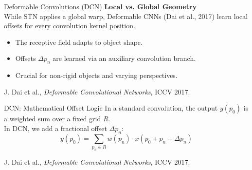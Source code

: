 \documentclass[aspectratio=169,10pt]{beamer}
\begin{document}
\begin{frame}{Deformable Convolutions (DCN)}
    \textbf{Local vs. Global Geometry}\\
    While STN applies a global warp, Deformable CNNs (Dai et al., 2017) learn local offsets for every convolution kernel position. 
    
    \vspace{0.5em}
    \begin{itemize}
        \item The receptive field adapts to object shape. 
        \item Offsets $\Delta p_n$ are learned via an auxiliary convolution branch.
        \item Crucial for non-rigid objects and varying perspectives.
    \end{itemize}
    \vfill
    {\tiny J. Dai et al., \textit{Deformable Convolutional Networks}, ICCV 2017.}
\end{frame}

\begin{frame}{DCN: Mathematical Offset Logic }
    In a standard convolution, the output $y(p_0)$ is a weighted sum over a fixed grid $R$.\\
    In DCN, we add a fractional offset $\Delta p_n$:
    $$y(p_{0})=\sum_{p_{n}\in R}w(p_{n})\cdot x(p_{0}+p_{n}+\Delta p_{n})$$ 
    \vspace{1em}

    \begin{table}[]
    \centering
    \end{table}
    \vfill
    {\tiny J. Dai et al., \textit{Deformable Convolutional Networks}, ICCV 2017.}
\end{frame}
\end{document}
